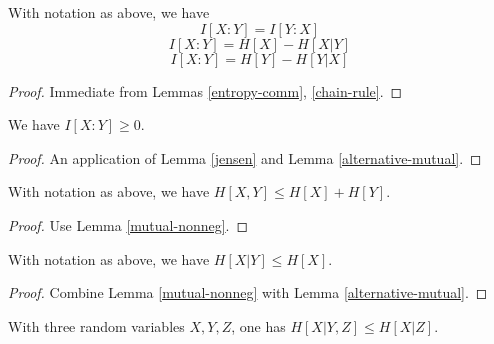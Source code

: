 \begin{lemma}
  \label{alternative-mutual}
  \leanok
  With notation as above, we have
  $$  I[X : Y] = I[Y:X]$$
  $$  I[X : Y] = H[X] - H[X|Y]$$
  $$  I[X : Y] = H[Y] - H[Y|X]$$
\end{lemma}

\begin{proof}
  \leanok
  Immediate from Lemmas \ref{entropy-comm}, \ref{chain-rule}.
\end{proof}

\begin{lemma}
  \label{mutual-nonneg}
  \leanok
  We have $I[X:Y] \geq 0$.
\end{lemma}

\begin{proof}   An application of Lemma \ref{jensen} and Lemma \ref{alternative-mutual}.
\end{proof}

\begin{corollary}[Subadditivity]
  \label{subadditive}
  \leanok
  With notation as above, we have $H[X,Y] \leq H[X] + H[Y]$.
\end{corollary}

\begin{proof}
  \leanok
  Use Lemma \ref{mutual-nonneg}.
\end{proof}

\begin{corollary}
  \label{cond-reduce}
  \leanok
  With notation as above, we have $H[X|Y] \leq H[X]$.
\end{corollary}
\begin{proof}
  \leanok
  Combine Lemma \ref{mutual-nonneg} with Lemma \ref{alternative-mutual}.
\end{proof}

\begin{corollary}[Submodularity]\label{submodularity}
  With three random variables $X,Y,Z$, one has $H[X|Y,Z] \leq H[X|Z]$.
\end{corollary}

